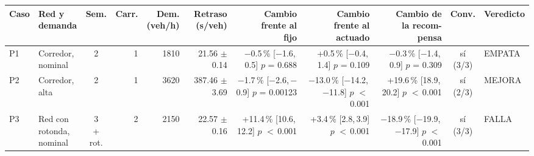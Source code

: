 \begin{table}[H]
\centering
\scriptsize
\setlength{\tabcolsep}{1.5pt}
\begin{tabular}{llcrrrrrrcl}
\toprule
Caso & \makecell[l]{Red y\\demanda} & Sem. & Carr. & \makecell{Dem.\\(veh/h)} & \makecell{Retraso\\(s/veh)} & \makecell{Cambio\\frente al\\fijo} & \makecell{Cambio\\frente al\\actuado} & \makecell{Cambio de\\la recom-\\pensa} & Conv. & Veredicto \\
\midrule
P1 & \makecell[l]{Corredor,\\{}nominal} & 2 & 1 & 1810 & \makecell[r]{21.56\\{}$\pm$ 0.14} & \makecell[r]{$-$0.5\,\%\\{}[$-$1.6,\,0.5]\\$p$ = 0.688} & \makecell[r]{+0.5\,\%\\{}[$-$0.4,\,1.4]\\$p$ = 0.109} & \makecell[r]{$-$0.3\,\%\\{}[$-$1.4,\,0.9]\\$p$ = 0.309} & \makecell[c]{sí\\{}(3/3)} & EMPATA \\
P2 & \makecell[l]{Corredor,\\{}alta} & 2 & 1 & 3620 & \makecell[r]{387.46\\{}$\pm$ 3.69} & \makecell[r]{$-$1.7\,\%\\{}[$-$2.6,\,$-$0.9]\\$p$ = 0.00123} & \makecell[r]{$-$13.0\,\%\\{}[$-$14.2,\,$-$11.8]\\$p$ $<$\,0.001} & \makecell[r]{+19.6\,\%\\{}[18.9,\,20.2]\\$p$ $<$\,0.001} & \makecell[c]{sí\\{}(2/3)} & MEJORA \\
P3 & \makecell[l]{Red con\\{}rotonda,\\{}nominal} & \makecell[c]{3\\{}+ rot.} & 2 & 2150 & \makecell[r]{22.57\\{}$\pm$ 0.16} & \makecell[r]{+11.4\,\%\\{}[10.6,\,12.2]\\$p$ $<$\,0.001} & \makecell[r]{+3.4\,\%\\{}[2.8,\,3.9]\\$p$ $<$\,0.001} & \makecell[r]{$-$18.9\,\%\\{}[$-$19.9,\,$-$17.9]\\$p$ $<$\,0.001} & \makecell[c]{sí\\{}(3/3)} & FALLA \\

\end{tabular}
\end{table}
